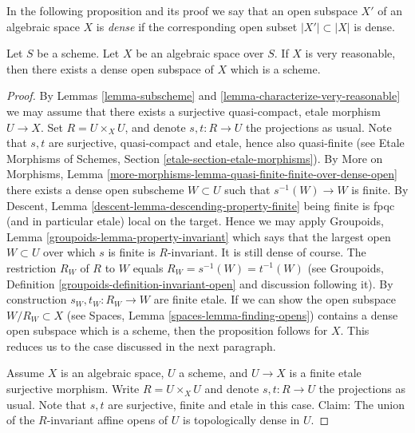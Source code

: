 \noindent
In the following proposition and its proof we say that an open subspace
$X'$ of an algebraic space $X$ is {\it dense} if the corresponding
open subset $|X'| \subset |X|$ is dense.

\begin{proposition}
\label{proposition-very-reasonable-open-dense-scheme}
Let $S$ be a scheme.
Let $X$ be an algebraic space over $S$.
If $X$ is very reasonable, then there exists a dense open subspace
of $X$ which is a scheme.
\end{proposition}

\begin{proof}
By Lemmas \ref{lemma-subscheme} and \ref{lemma-characterize-very-reasonable}
we may assume that there exists a surjective quasi-compact, etale morphism
$U \to X$. Set $R = U \times_X U$, and denote $s, t : R \to U$ the projections
as usual. Note that $s, t$ are surjective, quasi-compact and etale, hence
also quasi-finite (see
Etale Morphisms of Schemes, Section \ref{etale-section-etale-morphisms}).
By
More on Morphisms,
Lemma \ref{more-morphisms-lemma-quasi-finite-finite-over-dense-open}
there exists a dense open subscheme $W \subset U$ such that
$s^{-1}(W) \to W$ is finite. By
Descent, Lemma \ref{descent-lemma-descending-property-finite}
being finite is fpqc (and in particular etale) local on the target.
Hence we may apply
Groupoids, Lemma \ref{groupoids-lemma-property-invariant}
which says that the largest open $W \subset U$ over which $s$ is
finite is $R$-invariant. It is still dense of course.
The restriction $R_W$ of $R$ to $W$ equals $R_W = s^{-1}(W) = t^{-1}(W)$
(see Groupoids, Definition \ref{groupoids-definition-invariant-open}
and discussion following it).
By construction $s_W, t_W : R_W \to W$ are finite etale.
If we can show the open subspace $W/R_W \subset X$ (see
Spaces, Lemma \ref{spaces-lemma-finding-opens})
contains a dense open subspace which is a scheme, then the
proposition follows for $X$. This reduces us to the case discussed
in the next paragraph.

\medskip\noindent
Assume $X$ is an algebraic space, $U$ a scheme, and $U \to X$ is a finite
etale surjective morphism. Write $R = U \times_X U$ and denote
$s, t : R \to U$ the projections as usual. Note that $s, t$ are surjective,
finite and etale in this case. Claim:
The union of the $R$-invariant affine opens of $U$ is topologically
dense in $U$.


\end{proof}
